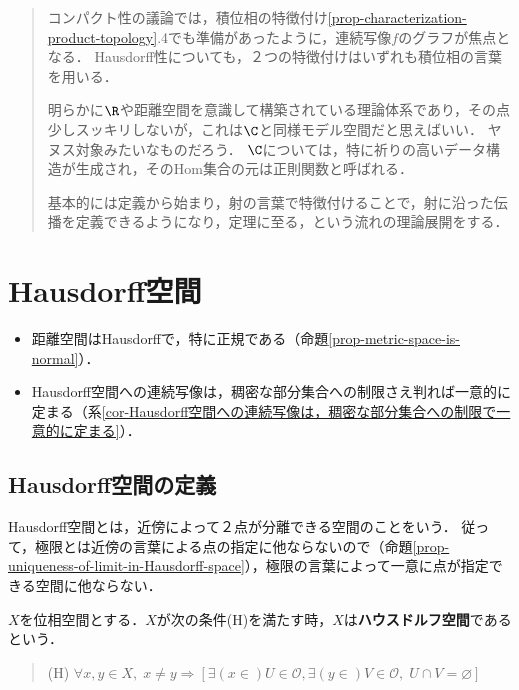 \documentclass[uplatex,dvipdfmx]{jsreport}
\begin{document}
\begin{quotation}
    コンパクト性の議論では，積位相の特徴付け\ref{prop-characterization-product-topology}.4でも準備があったように，連続写像$f$のグラフが焦点となる．
    Hausdorff性についても，２つの特徴付けはいずれも積位相の言葉を用いる．

    明らかに$\R$や距離空間を意識して構築されている理論体系であり，その点少しスッキリしないが，これは$\C$と同様モデル空間だと思えばいい．
    ヤヌス対象みたいなものだろう．
    $\C$については，特に祈りの高いデータ構造が生成され，そのHom集合の元は正則関数と呼ばれる．

    基本的には定義から始まり，射の言葉で特徴付けることで，射に沿った伝播を定義できるようになり，定理に至る，という流れの理論展開をする．
\end{quotation}

\section{Hausdorff空間}

\begin{tcolorbox}[colframe=ForestGreen, colback=ForestGreen!10!white, breakable ,colbacktitle=ForestGreen!40!white, coltitle=black,fonttitle=\bfseries\sffamily
    ,title=Hausdorff空間]
    \begin{itemize}
        \item 距離空間はHausdorffで，特に正規である（命題\ref{prop-metric-space-is-normal}）．
        \item Hausdorff空間への連続写像は，稠密な部分集合への制限さえ判れば一意的に定まる（系\ref{cor-Hausdorff空間への連続写像は，稠密な部分集合への制限で一意的に定まる}）．
    \end{itemize}
\end{tcolorbox}

\subsection{Hausdorff空間の定義}

\begin{tcolorbox}[colframe=ForestGreen, colback=ForestGreen!10!white, breakable ,colbacktitle=ForestGreen!40!white, coltitle=black,fonttitle=\bfseries\sffamily]
    Hausdorff空間とは，近傍によって２点が分離できる空間のことをいう．
    従って，極限とは近傍の言葉による点の指定に他ならないので（命題\ref{prop-uniqueness-of-limit-in-Hausdorff-space}），極限の言葉によって一意に点が指定できる空間に他ならない．
\end{tcolorbox}

\begin{definition}[Hausdorff]\label{def-Hausdorff-axiom}
    $X$を位相空間とする．$X$が次の条件(H)を満たす時，$X$は\textbf{ハウスドルフ空間}であるという．
    \begin{quote}
        (H) $\forall x,y\in X,\; x\ne y\Rightarrow [\exists (x\in )U\in\mathcal{O}, \exists(y\in)V\in\mathcal{O},\;U\cap V=\varnothing]$
    \end{quote}
\end{definition}
\end{document}
